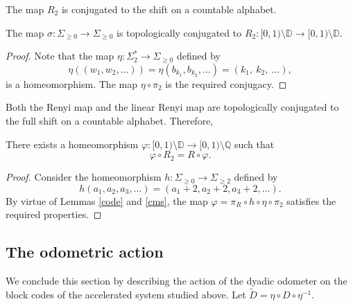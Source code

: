 \documentclass[letterpaper,10pt,reqno]{amsart}
\numberwithin{equation}{section}     %
\def\phi{\varphi}
\def\Q{{\mathbb Q}}
\begin{document}
The map $R_2$ is conjugated to the shift on a countable alphabet.

\begin{lemma} \label{cms}
The map $\sigma:\Sigma_{\geq 0}\to \Sigma_{\geq 0}$ is topologically conjugated to $R_2:[0,1) \setminus \mathbb{D} \to 
[0,1) \setminus \mathbb{D} $.
\end{lemma}

\begin{proof}
Note that the map $\eta: \Sigma_2^* \to \Sigma_{\geq 0}$ defined by 
\begin{equation*}
\eta((w_1,w_2, \dots))= \eta (b_{k_1}, b_{k_2}, \dots)= (k_1, \ k_2,  \ \dots),
\end{equation*}
is a homeomorphism. The map $\eta \circ \pi_2$ is the required conjugacy.
\end{proof}


Both the Renyi map and the linear Renyi map are topologically conjugated to the full shift on a countable alphabet. Therefore,

\begin{proposition} \label{con}
There exists {{}{a}} homeomorphism $\phi: [0,1) \setminus \mathbb{D} \to [0,1) \setminus \Q$ such that
\begin{equation*}
\phi \circ R_2= R \circ \phi.
\end{equation*}
\end{proposition}

 \begin{proof}
 Consider the homeomorphism 
 $h:\Sigma_{\geq 0}  \to \Sigma_{\geq 2}$ defined by 
 \begin{equation*}
 h(a_1, a_2, a_3, \dots)=(a_1+2,a_2+2, a_3 +2, \dots ).
 \end{equation*} 
 By virtue of Lemmas \ref{code}  and \ref{cms}, the map $\phi= \pi_R \circ h \circ \eta \circ \pi_2$ satisfies the required properties. 
 \end{proof}




\subsection{The odometric action}


We conclude this section {{}{by}} describing the action of the dyadic odometer on the block codes of the accelerated system studied above.  Let $ \tilde{D}=\eta\circ D \circ \eta^{-1}$.
 
\end{document}
